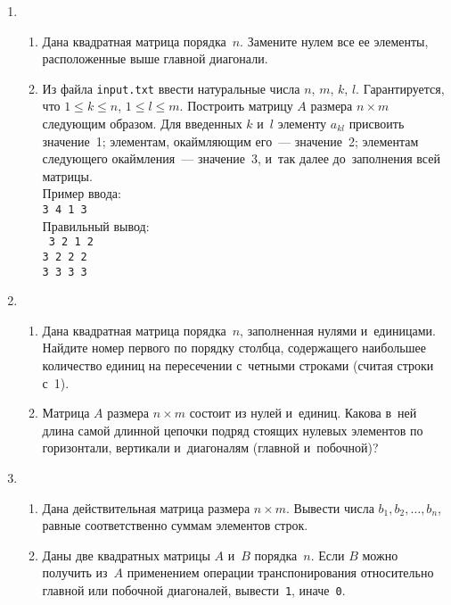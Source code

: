 \documentclass{article}
\newcommand{\textex}[1]{\texttt{\color{ForestGreen}#1}}
\begin{document}
\begin{enumerate}[label={}, leftmargin=0pt, itemindent=0pt]
\item
\begin{enumerate}[label=\arabic{enumi}.\arabic*.] %
  \item
  Дана квадратная матрица порядка~$n$. Замените нулем все ее элементы, расположенные выше главной диагонали. 
  \item
  Из файла \texttt{input.txt} ввести натуральные числа $n$, $m$, $k$, $l$. Гарантируется, что $1\leq k \leq n$, $1\leq l \leq m$. Построить матрицу $A$ размера $n\times m$  следующим образом. Для введенных $k$ и~$l$ элементу $a_{kl}$ присвоить значение~1; элементам, окаймляющим его~— значение~2; элементам следующего окаймления~— значение~3, и~так далее до~заполнения всей матрицы.\\
  Пример ввода:\\\textex{3 4 1 3}\\
  Правильный вывод:\\\textex{
  3 2 1 2\\ 
  3 2 2 2\\ 
  3 3 3 3}
\end{enumerate}

\item
\begin{enumerate}[label=\arabic{enumi}.\arabic*.] %
  \item
  Дана квадратная матрица порядка~$n$, заполненная нулями и~единицами. Найдите номер первого по порядку столбца, содержащего наибольшее количество единиц на пересечении с~четными строками (считая строки с~1).
  \item
  Матрица $A$ размера $n \times m$ состоит из нулей и~единиц. Какова в~ней длина самой длинной цепочки подряд стоящих нулевых элементов по горизонтали, вертикали и~диагоналям (главной и~побочной)?
\end{enumerate}

\item
\begin{enumerate}[label=\arabic{enumi}.\arabic*.] %
  \item
  Дана действительная матрица размера $n\times m$. Вывести числа $b_1, b_2,  \ldots,  b_n$, равные соответственно суммам элементов строк. 
  \item
  Даны две квадратных матрицы $A$ и~$B$ порядка~$n$. Если $B$ можно получить из~$A$ применением операции транспонирования относительно главной или побочной диагоналей, вывести~\textex{1}, иначе~\textex{0}.
\end{enumerate}


\end{enumerate}
\end{document}
